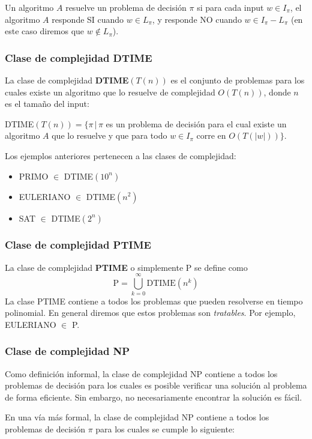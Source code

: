 \begin{multicols}{2}
    Un algoritmo $A$ resuelve un problema de decisión $\pi$ si para cada input $w \in I_\pi$, el algoritmo $A$ responde SI cuando $w \in L_\pi$, y responde NO cuando $w \in I_\pi - L_\pi$ (en este caso diremos que $w \notin L_\pi$).
    
    \subsubsection*{Clase de complejidad DTIME}
    La clase de complejidad \textbf{DTIME}$(T(n))$ es el conjunto de problemas para los cuales existe un algoritmo que lo resuelve de complejidad $O(T(n))$, donde $n$ es el tamaño del input: \p
    
    DTIME$(T(n)) = \{ \pi \,|\, \pi$ es un problema de decisión para el cual existe un algoritmo $A$ que lo resuelve y que para todo $w \in I_\pi$ corre en $O(T(|w|))\}$. \p
    
    Los ejemplos anteriores pertenecen a las clases de complejidad:
    \begin{itemize}
        \item PRIMO $\in$ DTIME$(10^n)$
        \item EULERIANO $\in$ DTIME$(n^2)$
        \item SAT $\in$ DTIME$(2^n)$
    \end{itemize}
    
    \subsubsection*{Clase de complejidad PTIME}
    
    La clase de complejidad \textbf{PTIME} o simplemente P se define como
    $$
    \text{P} = \bigcup_{k = 0}^\infty \text{DTIME}(n^k)
    $$
    La clase PTIME contiene a todos los problemas que pueden resolverse en tiempo polinomial. En general diremos que estos problemas son \textit{tratables}. Por ejemplo, EULERIANO $\in$ P.
    
    \subsubsection*{Clase de complejidad NP}
    Como definición informal, la clase de complejidad NP contiene a todos los problemas de decisión para los cuales es posible verificar una solución al problema de forma eficiente. Sin embargo, no necesariamente encontrar la solución es fácil. \p
    
    En una vía más formal, la clase de complejidad NP contiene a todos los problemas de decisión $\pi$ para los cuales se cumple lo siguiente: \p
    

\end{multicols}
